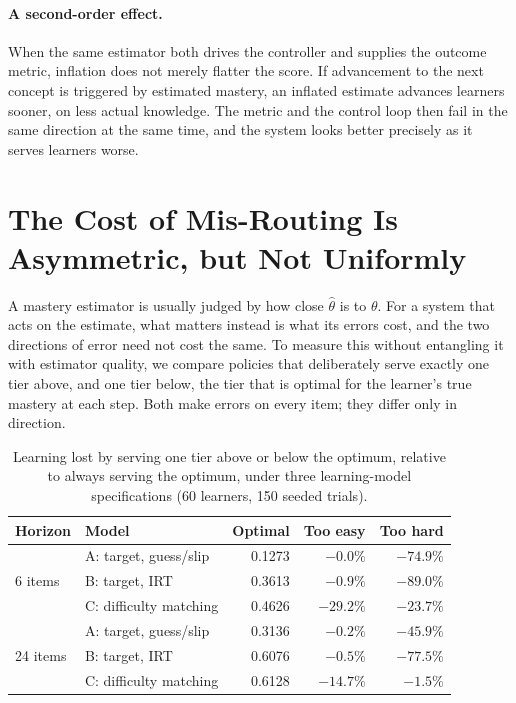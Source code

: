 \documentclass[notitlepage,12pt]{jedm}
\begin{document}
\paragraph{A second-order effect.} When the same estimator both drives the controller and supplies the outcome metric, inflation does not merely flatter the score. If advancement to the next concept is triggered by estimated mastery, an inflated estimate advances learners sooner, on less actual knowledge. The metric and the control loop then fail in the same direction at the same time, and the system looks better precisely as it serves learners worse.

\section{The Cost of Mis-Routing Is Asymmetric, but Not Uniformly}
\label{sec:asymmetry}

A mastery estimator is usually judged by how close $\hat{\theta}$ is to $\theta$. For a system that acts on the estimate, what matters instead is what its errors cost, and the two directions of error need not cost the same. To measure this without entangling it with estimator quality, we compare policies that deliberately serve exactly one tier above, and one tier below, the tier that is optimal for the learner's true mastery at each step. Both make errors on every item; they differ only in direction.

\begin{table}[ht]
\centering
\caption{Learning lost by serving one tier above or below the optimum, relative to always serving the optimum, under three learning-model specifications (60 learners, 150 seeded trials).}
\label{tab:asymmetry}
\footnotesize
\begin{tabular}{llrrr}
\toprule
Horizon & Model & Optimal & Too easy & Too hard \\
\midrule
\multirow{3}{*}{6 items}
 & A: target, guess/slip & 0.1273 & $-0.0\%$  & $-74.9\%$ \\
 & B: target, IRT        & 0.3613 & $-0.9\%$  & $-89.0\%$ \\
 & C: difficulty matching        & 0.4626 & $-29.2\%$ & $-23.7\%$ \\
\midrule
\multirow{3}{*}{24 items}
 & A: target, guess/slip & 0.3136 & $-0.2\%$  & $-45.9\%$ \\
 & B: target, IRT        & 0.6076 & $-0.5\%$  & $-77.5\%$ \\
 & C: difficulty matching        & 0.6128 & $-14.7\%$ & $-1.5\%$ \\
\bottomrule
\end{tabular}
\end{table}
\end{document}

